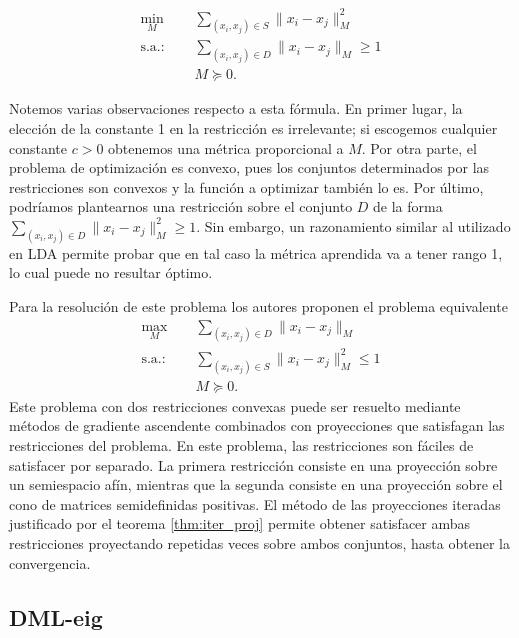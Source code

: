 \begin{equation} \label{eq:lsi}
\begin{split}
    \min_{M} &\quad \sum_{(x_i,x_j)\in S}  \|x_i - x_j \|_M^2 \\
    \text{s.a.: } &\quad \sum_{(x_i,x_j) \in D} \|x_i - x_j\|_M \ge 1 \\
                  &\quad M \succeq 0.
\end{split}
\end{equation}

Notemos varias observaciones respecto a esta fórmula. En primer lugar, la elección de la constante 1 en la restricción es irrelevante; si escogemos cualquier constante $c > 0$ obtenemos una métrica proporcional a $M$. Por otra parte, el problema de optimización es convexo, pues los conjuntos determinados por las restricciones son convexos y la función a optimizar también lo es. Por último, podríamos plantearnos una restricción sobre el conjunto $D$ de la forma $\sum_{(x_i,x_j) \in D} \|x_i - x_j\|_M^2 \ge 1$. Sin embargo, un razonamiento similar al utilizado en LDA permite probar que en tal caso la métrica aprendida va a tener rango 1, lo cual puede no resultar óptimo.

Para la resolución de este problema los autores proponen el problema equivalente
\begin{equation} \label{eq:lsi:equiv}
\begin{split}
    \max_{M} &\quad \sum_{(x_i,x_j)\in D}  \|x_i - x_j \|_M \\
    \text{s.a.: } &\quad \sum_{(x_i,x_j) \in S} \|x_i - x_j\|_M^2 \le 1 \\
                  &\quad M \succeq 0.
\end{split}
\end{equation}
Este problema con dos restricciones convexas puede ser resuelto mediante métodos de gradiente ascendente combinados con proyecciones que satisfagan las restricciones del problema. En este problema, las restricciones son fáciles de satisfacer por separado. La primera restricción consiste en una proyección sobre un semiespacio afín, mientras que la segunda consiste en una proyección sobre el cono de matrices semidefinidas positivas. El método de las proyecciones iteradas justificado por el teorema \ref{thm:iter_proj} permite obtener satisfacer ambas restricciones proyectando repetidas veces sobre ambos conjuntos, hasta obtener la convergencia.

\subsection{DML-eig}

